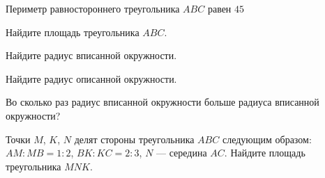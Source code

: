 \begin{ex}
	\begin{condition}
		Периметр равностороннего треугольника \( ABC \) равен \( 45 \)
		\begin{enumcols}[label=\arabic*)]
			\item Найдите площадь треугольника \( ABC \).
			\item Найдите радиус вписанной окружности.
			\item Найдите радиус описанной окружности.
			\item Во сколько раз радиус вписанной окружности больше радиуса вписанной окружности?
			\item Точки \( M \), \( K \), \( N \) делят стороны треугольника \( ABC \) следующим образом: \( AM:MB=1:2 \), \( BK:KC=2:3 \), \( N \) --- середина \( AC \). Найдите площадь треугольника \( MNK \).
		\end{enumcols}
	\end{condition}
\end{ex}
